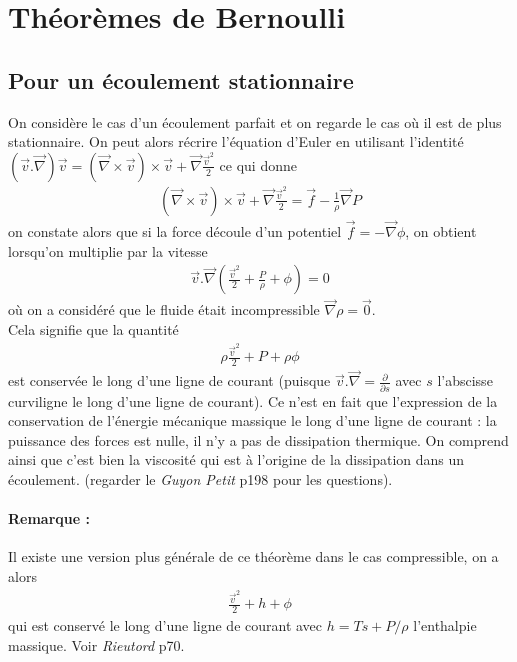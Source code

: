 \documentclass[12pt,prb,aps,epsf]{article}
\begin{document}
\section{Théorèmes de Bernoulli}
\subsection{Pour un écoulement stationnaire}
On considère le cas d'un écoulement parfait et on regarde le cas où il est de plus stationnaire. On peut alors récrire l'équation d'Euler en utilisant l'identité $(\vec{v}.\vec{\nabla})\vec{v} = (\vec{\nabla}\times\vec{v})\times\vec{v} + \vec{\nabla}\frac{\vec{v}^2}{2}$ ce qui donne
\begin{eqnarray}
(\vec{\nabla}\times\vec{v})\times\vec{v} + \vec{\nabla}\frac{\vec{v}^2}{2} = \vec{f} - \frac{1}{\rho}\vec{\nabla} P 
\end{eqnarray}
on constate alors que si la force découle d'un potentiel $\vec{f} = -\vec{\nabla}\phi$, on obtient lorsqu'on multiplie par la vitesse 
\begin{eqnarray}
\vec{v}.\vec{\nabla}\left(\frac{\vec{v}^2}{2} + \frac{P}{\rho} + \phi\right) = 0
\end{eqnarray}
où on a considéré que le fluide était incompressible $\vec{\nabla}\rho = \vec{0}$. \\

Cela signifie que la quantité 
\begin{eqnarray}
\rho \frac{\vec{v}^2}{2} + P +\rho \phi
\end{eqnarray}
est conservée le long d'une ligne de courant (puisque $\vec{v}.\vec{\nabla} = \frac{\partial}{\partial s}$ avec $s$ l'abscisse curviligne le long d'une ligne de courant). Ce n'est en fait que l'expression de la conservation de l'énergie mécanique massique le long d'une ligne de courant : la puissance des forces est nulle, il n'y a pas de dissipation thermique. On comprend ainsi que c'est bien la viscosité qui est à l'origine de la dissipation dans un écoulement. (regarder le \textit{Guyon Petit} p198 pour les questions).

\paragraph{Remarque :} Il existe une version plus générale de ce théorème dans le cas compressible, on a alors 
\begin{eqnarray}
\frac{\vec{v}^2}{2} + h + \phi 
\end{eqnarray}
qui est conservé le long d'une ligne de courant avec $h = Ts + P/\rho$ l'enthalpie massique. Voir \textit{Rieutord} p70.\\
\end{document}
